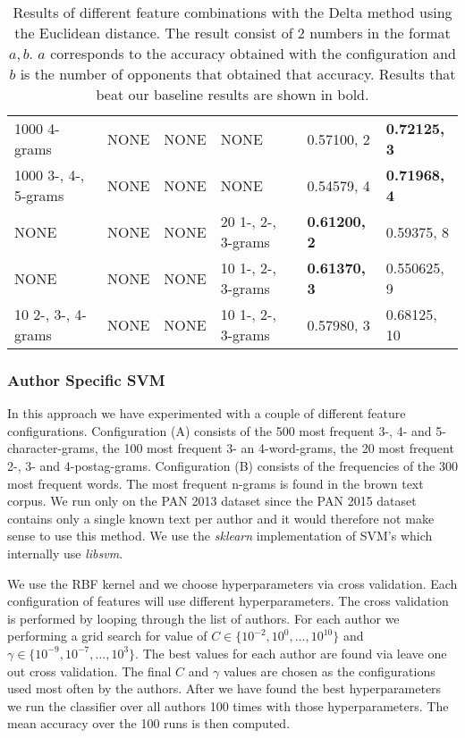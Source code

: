\begin{landscape}
\begin{table}
\begin{tabular}{llll|ll}
        1000 4-grams & NONE & NONE & NONE & 0.57100, 2 & \textbf{0.72125, 3} \\
        1000 3-, 4-, 5-grams & NONE & NONE & NONE & 0.54579, 4 &
        \textbf{0.71968, 4} \\
        NONE & NONE & NONE & 20 1-, 2-, 3-grams & \textbf{0.61200, 2} &
        0.59375, 8 \\
        NONE & NONE & NONE & 10 1-, 2-, 3-grams & \textbf{0.61370, 3} &
        0.550625, 9 \\
        10 2-, 3-, 4-grams & NONE & NONE & 10 1-, 2-, 3-grams & 0.57980, 3 &
        0.68125, 10
    \end{tabular}
    \caption{Results of different feature combinations with the Delta method
    using the Euclidean distance.  The result consist of 2 numbers in the format
    $a, b$. $a$ corresponds to the accuracy obtained with the configuration and
    $b$ is the number of opponents that obtained that accuracy. Results that
    beat our baseline results are shown in bold.}
    \label{fig:extended_delta_method_euclidean_result}
\end{table}
\end{landscape}

\subsubsection{Author Specific SVM} \label{subsec:author_specific_svm_impl}
In this approach we have experimented with a couple of different feature
configurations. Configuration (A) consists of the 500 most frequent 3-, 4-
and 5-character-grams, the 100 most frequent 3- an 4-word-grams, the 20
most frequent 2-, 3- and 4-postag-grams. Configuration (B) consists of the
frequencies of the 300 most frequent words. The most frequent n-grams is found
in the brown text corpus. We run only on the PAN 2013 dataset since the PAN 2015
dataset contains only a single known text per author and it would therefore not
make sense to use this method. We use the \textit{sklearn} implementation of
\gls{SVM}'s which internally use \textit{libsvm}.

We use the RBF kernel and we choose hyperparameters via cross validation.
Each configuration of features will use different hyperparameters. The cross
validation is performed by looping through the list of authors. For each author
we performing a grid search for value of $C \in \{10^{-2}, 10^{0}, \dots,
10^{10}\}$ and $\gamma \in \{10^{-9}, 10^{-7}, \dots, 10^{3}\}$. The best values
for each author are found via leave one out cross validation. The final $C$ and
$\gamma$ values are chosen as the configurations used most often by the authors.
After we have found the best hyperparameters we run the classifier over all
authors 100 times with those hyperparameters. The mean accuracy over the 100
runs is then computed.

